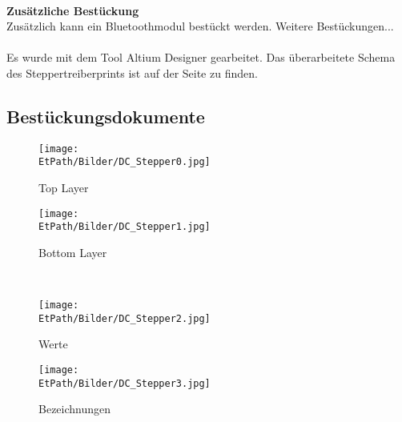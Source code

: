     \\
    \textbf{Zusätzliche Bestückung}\\
    Zusätzlich kann ein Bluetoothmodul bestückt werden. Weitere 
    Bestückungen...\\\\
    Es wurde mit dem Tool Altium Designer gearbeitet. Das überarbeitete Schema 
    des Steppertreiberprints ist auf der Seite \pageref{Schema} zu finden. 
    
    \newpage
    \subsection*{Bestückungsdokumente}
    \begin{figure}[h!]
        \centering
        \begin{minipage}[hbt]{6cm}
            \centering
            \texttt{[image: \\EtPath/Bilder/DC\_Stepper0.jpg]}
            \caption{Top Layer}
            \label{fig:Top Layer}
        \end{minipage}
        \hspace{1.5cm}
        \begin{minipage}[hbt]{6cm}
            \centering
            \texttt{[image: \\EtPath/Bilder/DC\_Stepper1.jpg]}
            \caption{Bottom Layer}
            \label{fig:Bottom Layer}
        \end{minipage}
        \\[4ex]
        \begin{minipage}[hbt]{6cm}
            \centering
            \texttt{[image: \\EtPath/Bilder/DC\_Stepper2.jpg]}
            \caption{Werte}
            \label{fig:Werte}
        \end{minipage}
        \hspace{1.5cm}
        \begin{minipage}[hbt]{6cm}
            \centering
            \texttt{[image: \\EtPath/Bilder/DC\_Stepper3.jpg]}
            \caption{Bezeichnungen}
            \label{fig:Bezeichnungen}
        \end{minipage}
    \end{figure}
    \ifSTANDALONE
